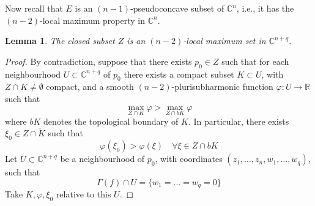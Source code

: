 \documentclass[reqno,oneside]{amsart}
\newcommand{\numberset}{\mathbb}
\newcommand{\R}{\numberset{R}}
\newcommand{\C}{\numberset{C}}
\renewcommand{\phi}{\varphi}
\theoremstyle{definition}
\theoremstyle{plain}
\newtheorem{lemma}[definition]{Lemma}
\theoremstyle{remark}
\begin{document}
Now recall that $E$ is an $(n-1)$-pseudoconcave subset of $\C^n$, i.e., it has the $(n-2)$-local maximum property in $\C^n$.
\begin{lemma}
	The closed subset $Z$ is an $(n-2)$-local maximum set in $\C^{n+q}$.
\end{lemma}
\begin{proof}
	By contradiction, suppose that there exists $p_0\in Z$ such that for each neighbourhood $U\subset\C^{n+q}$ of $p_0$ there exists a compact subset $K\subset U$, with $Z\cap K\neq\emptyset$ compact, and a smooth $(n-2)$-plurisubharmonic function $\phi:U\to\R$ such that
	\[
		\max_{Z\cap K}\phi>\max_{Z\cap bK}\phi
	\]
	where $bK$ denotes the topological boundary of $K$. In particular, there exists $\xi_0\in Z\cap\mathring{K}$ such that
	\[
		\phi(\xi_0)>\phi(\xi) \quad \forall\xi\in Z\cap bK
	\]
	Let $U\subset\C^{n+q}$ be a neighbourhood of $p_0$, with coordinates $(z_1,\dots,z_n,w_1,\dots,w_q)$, such that
	\[
		\Gamma(f)\cap U=\{w_1=\dots=w_q=0\}
	\]
	Take $K,\phi,\xi_0$ relative to this $U$.
	

\end{proof}
\end{document}
